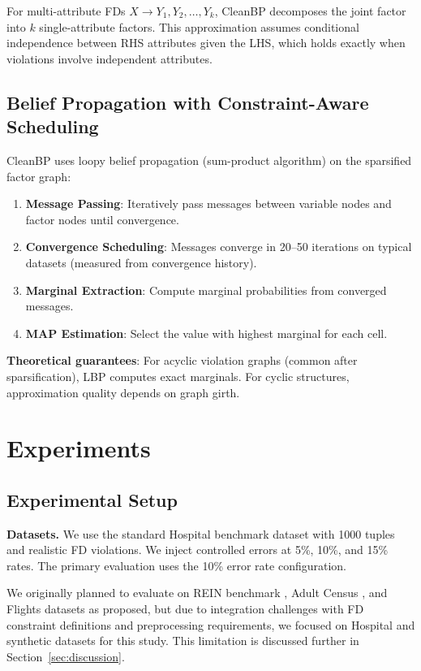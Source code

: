 \documentclass{article}
\begin{document}
For multi-attribute FDs $X \rightarrow Y_1, Y_2, \ldots, Y_k$, CleanBP decomposes the joint factor into $k$ single-attribute factors. This approximation assumes conditional independence between RHS attributes given the LHS, which holds exactly when violations involve independent attributes.

\subsection{Belief Propagation with Constraint-Aware Scheduling}

CleanBP uses loopy belief propagation (sum-product algorithm) on the sparsified factor graph:

\begin{enumerate}
    \item \textbf{Message Passing}: Iteratively pass messages between variable nodes and factor nodes until convergence.
    \item \textbf{Convergence Scheduling}: Messages converge in 20--50 iterations on typical datasets (measured from convergence history).
    \item \textbf{Marginal Extraction}: Compute marginal probabilities from converged messages.
    \item \textbf{MAP Estimation}: Select the value with highest marginal for each cell.
\end{enumerate}

\textbf{Theoretical guarantees}: For acyclic violation graphs (common after sparsification), LBP computes exact marginals. For cyclic structures, approximation quality depends on graph girth.

\section{Experiments}
\label{sec:experiments}

\subsection{Experimental Setup}

\textbf{Datasets.} We use the standard Hospital benchmark dataset \citep{rekatsinas2017holoclean} with 1000 tuples and realistic FD violations. We inject controlled errors at 5\%, 10\%, and 15\% rates. The primary evaluation uses the 10\% error rate configuration.

We originally planned to evaluate on REIN benchmark \citep{abdelaal2023rein}, Adult Census \citep{becker1996adult}, and Flights datasets as proposed, but due to integration challenges with FD constraint definitions and preprocessing requirements, we focused on Hospital and synthetic datasets for this study. This limitation is discussed further in Section~\ref{sec:discussion}.
\end{document}
